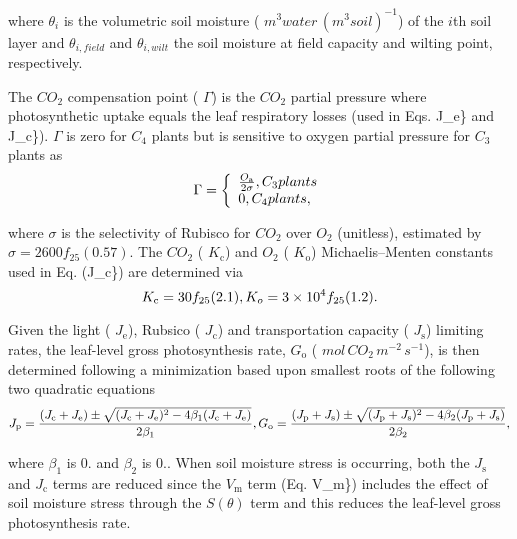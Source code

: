 where $\theta_{i}$ is the volumetric soil moisture ( $m^{3} water\,(m^{3} soil)^{-1}$) of the $i$th soil layer and $\theta_{i,field}$ and $\theta_{i, wilt}$ the soil moisture at field capacity and wilting point, respectively.

The $CO_2$ compensation point ( $\Gamma$) is the $CO_2$ partial pressure where photosynthetic uptake equals the leaf respiratory losses (used in Eqs. J\+\_\+e\} and J\+\_\+c\}). $\Gamma$ is zero for $C_4$ plants but is sensitive to oxygen partial pressure for $C_3$ plants as \[ \label{co2comp} \Gamma = \left\{\begin{array}{l l} \frac{O_\mathrm{a}}{2 \sigma}, C_3 plants\\ 0, C_4 plants, \end{array} \right. \]

where $\sigma$ is the selectivity of Rubisco for $CO_2$ over $O_2$ (unitless), estimated by $\sigma = 2600f_{25}(0.57)$. The $CO_2$ ( $K_\mathrm{c}$) and $O_2$ ( $K_\mathrm{o}$) Michaelis--Menten constants used in Eq. (J\+\_\+c\}) are determined via \[ \label{K_c} K_\mathrm{c} = 30f_{25}(2.1), \\ \label{K_o} K_o = 3 \times 10^4 f_{25}(1.2). \]

Given the light ( $J_\mathrm{e}$), Rubsico ( $J_\mathrm{c}$) and transportation capacity ( $J_\mathrm{s}$) limiting rates, the leaf-\/level gross photosynthesis rate, $G_\mathrm{o}$ ( $mol\,CO_2\,m^{-2}\,s^{-1}$), is then determined following a minimization based upon smallest roots of the following two quadratic equations \[ J_\mathrm{p} = \frac{(J_\mathrm{c} + J_\mathrm{e}) \pm \sqrt{(J_\mathrm{c} + J_\mathrm{e})^2 - 4\beta_1 (J_\mathrm{c} + J_\mathrm{e})}}{2\beta_1} , \\ \label{G_o}G_\mathrm{o} = \frac{(J_\mathrm{p} + J_\mathrm{s}) \pm \sqrt{(J_\mathrm{p} + J_\mathrm{s})^2 - 4\beta_2 (J_\mathrm{p} + J_\mathrm{s})}}{2\beta_2}, \]

where $\beta_1$ is 0. and $\beta_2$ is 0.. When soil moisture stress is occurring, both the $J_\mathrm{s}$ and $J_\mathrm{c}$ terms are reduced since the $V_\mathrm{m}$ term (Eq. V\+\_\+m\}) includes the effect of soil moisture stress through the $S(\theta)$ term and this reduces the leaf-\/level gross photosynthesis rate.

